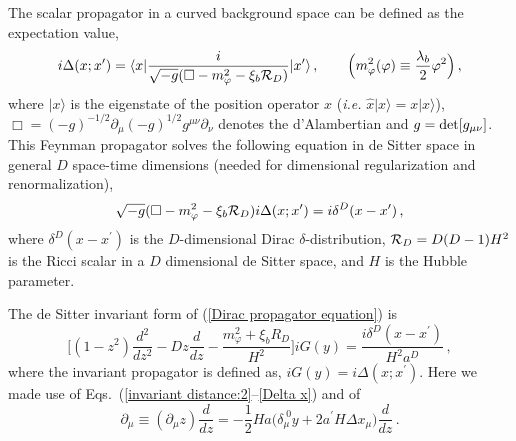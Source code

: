 \documentclass[aps,12pt,superscriptaddress,preprintnumbers,
                secnumarabic,nofootinbib,showpacs]{revtex4}
\begin{document}
The scalar propagator in a curved background space
can be defined as the expectation value,
\begin{equation}
 i\Delta(x;x^\prime) = \langle x|
                  \frac{i}{\sqrt{-g}(\Box - m_\varphi^2 - \xi_b{\cal R}_D)}
                  |x^\prime\rangle
\,,\qquad \Big(m_\varphi^2(\varphi)
               \equiv \frac{\lambda_b}{2}\varphi^2\Big)
\,,
\label{de Sitter scalar propagator}
\end{equation}
where $|x\rangle$ is the eigenstate of the position operator $\hat x$
({\it i.e.} $\hat x |x\rangle = x|x\rangle$),
 $\Box=(-g)^{-1/2}\partial_\mu (-g)^{1/2}g^{\mu\nu}\partial_\nu$ denotes
the d'Alambertian and $g={\rm det}[g_{\mu\nu}]$.
This Feynman propagator solves the following equation in de Sitter space
in general $D$ space-time dimensions
(needed for dimensional regularization and renormalization),
\begin{equation}
\sqrt{-g} (\Box - m_\varphi^2 - \xi_b{\cal
R}_D)i\Delta(x;x^\prime)
          = i \delta^D(x-x^\prime)
\,,
\label{Dirac propagator equation}
\end{equation}
where $\delta^D(x-x^\prime)$
is the $D$-dimensional Dirac $\delta$-distribution,
${\cal R}_D = D(D-1)H^2$ is the Ricci scalar in a $D$ dimensional
de Sitter space, and $H$ is the Hubble parameter.

 The de Sitter invariant form of (\ref{Dirac propagator equation})
is~\cite{ChernikovTagirov:1968,Tagirov:1972,BunchDavies:1978,ProkopecPuchwein:2003}
\begin{equation}
     \bigg[
         (1-z^2)\frac{d^2}{dz^2}
       - Dz\frac{d}{dz}
       - \frac{m_\varphi^2+\xi_b R_D}{H^2}
    \bigg]i G(y)
       = \frac{i \delta^D(x-x^\prime)}{H^2 a^{D}}
\,,
\label{dS:scalar propagator}
\end{equation}
where the invariant propagator is defined as, $iG(y) =
i\Delta(x;x^\prime)$. Here we made use of
Eqs.~(\ref{invariant distance:2}--\ref{Delta x}) and of
\begin{equation}
 \partial_\mu \equiv (\partial_\mu z)\frac{d}{dz}
                = - \frac12 Ha\Big(
                                  \delta_\mu^{\;0}y + 2 a^\prime H \Delta x_\mu
                               \Big) \frac{d}{dz}
\,.
\label{partial-mu:z}
\end{equation}
\end{document}
